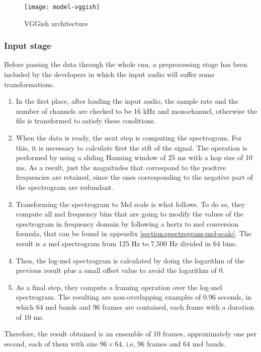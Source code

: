 	\begin{figure}
		\centering
		\captionsetup{justification=centering}
		\texttt{[image: model-vggish]}
		\caption{VGGish architecture}
		\label{fig:mesh2}
	\end{figure}

\subsubsection*{Input stage}

	Before passing the data through the whole \acrshort{cnn}, a preprocessing stage has been included by the developers in which the input audio will suffer some transformations. 

	\begin{enumerate}
		\item In the first place, after loading the input audio, the sample rate and the number of channels are checked to be 16 kHz and monochannel, otherwise the file is transformed to satisfy these conditions.
		\item When the data is ready, the next step is computing the spectrogram. For this, it is necessary to calculate first the \acrfull{stft} of the signal. The operation is performed by using a sliding Hanning window of 25 ms with a hop size of 10 ms. As a result, just the magnitudes that correspond to the positive frequencies are retained, since the ones corresponding to the negative part of the spectrogram are redundant.
		\item  Transforming the spectrogram to Mel scale is what follows. To do so, they compute all mel frequency bins that are going to modify the values of the spectrogram in frequency domain by following a hertz to mel conversion formula, that can be found in appendix \ref{section:spectrogram-mel-scale}. The result is a mel spectrogram from 125 Hz to 7,500 Hz divided in 64 bins.
		\item Then, the log-mel spectrogram is calculated by doing the logarithm of the previous result plus a small offset value to avoid the logarithm of $0$.
		\item As a final step, they compute a framing operation over the log-mel spectrogram. The resulting are non-overlapping examples of 0.96 seconds, in which 64 mel bands and 96 frames are contained, each frame with a duration of 10 ms.
	\end{enumerate}

	Therefore, the result obtained is an ensemble of 10 frames, approximately one per second, each of them with size $96 \times 64$, i.e, 96 frames and 64 mel bands.

